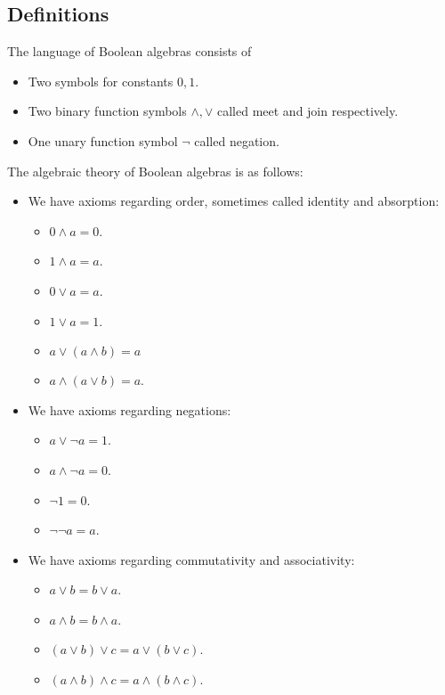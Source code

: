 \documentclass{../util/zariski-small}
\begin{document}
\subsection{Definitions}
\begin{definition}
  The language of Boolean algebras consists of
  \begin{itemize}
    \item Two symbols for constants $0,1$. 
    \item Two binary function symbols $\wedge, \vee$ called meet and join respectively. 
    \item One unary function symbol $\neg$ called negation. 
  \end{itemize}
\end{definition}
\begin{definition}
  The algebraic theory of Boolean algebras is as follows:
  \begin{itemize}
    \item We have axioms regarding order, sometimes called identity and absorption:
    \begin{itemize}
      \item $0 \wedge a = 0$. 
      \item $1 \wedge a = a$. 
      \item $0 \vee a = a$. 
      \item $1 \vee a = 1$. 
      \item $a \vee (a \wedge b) = a$
      \item $a \wedge (a \vee b) = a$. 
    \end{itemize}
    \item We have axioms regarding negations:
      \begin{itemize}
        \item $a \vee \neg a = 1$. 
        \item $a \wedge \neg a = 0$. 
        \item $\neg 1 = 0$. 
        \item $\neg \neg a = a$. 
      \end{itemize}
    \item We have axioms regarding commutativity and associativity:
      \begin{itemize}
        \item $a \vee b = b \vee a$. 
        \item $a \wedge b = b \wedge a$. 
        \item $(a \vee b) \vee c = a \vee (b \vee c)$. 
        \item $(a \wedge b) \wedge c = a \wedge (b \wedge c)$. 

\end{itemize}
\end{itemize}
\end{definition}
\end{document}
